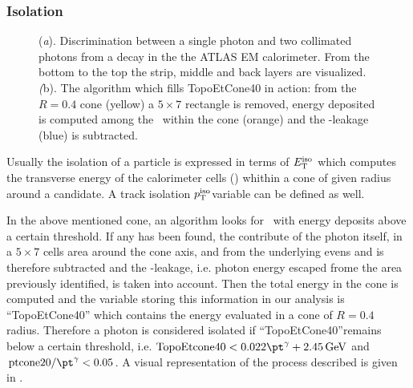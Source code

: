 \subsubsection{Isolation}
\begin{figure}[tp]
\centering
{} \quad
{} 
\caption{(\emph{a}). Discrimination between a single photon and two collimated photons from a \pizero decay in the the ATLAS EM calorimeter. From the bottom to the top the strip, middle and back layers are visualized. \\ \emph({b}). The algorithm which fills TopoEtCone40 in action: from the $R=0.4$ cone (yellow) a $5\times7$ rectangle is removed, energy deposited is computed among the \topo~within the cone (orange) and the \pt-leakage (blue) is subtracted.}
\end{figure}
Usually the isolation of a particle is expressed in terms of $E_\textup{T}^{\textup{iso}}$ which computes the transverse energy of the calorimeter cells (\topo) whithin a cone of given radius around a candidate. A track isolation $p_\textup{T}^{\textup{iso}}$variable can be defined as well.

In the above mentioned cone, an algorithm looks for \topo~with energy deposits above a certain threshold. If any has been found, the contribute of the photon itself, in a $5\times7$ cells area around the cone axis, and from the underlying evens and \pileup is therefore subtracted and the \pt-leakage, i.e. photon energy escaped frome the area previously identified, is taken into account. Then the total energy in the cone is computed and the variable storing this information in our analysis is ``TopoEtCone40'' which contains the energy evaluated in a cone of $R=0.4$ radius. Therefore a photon is considered isolated if ``TopoEtCone40''remains below a certain threshold, i.e. $\text{TopoEtcone40} < 0.022\pt^\gamma + \SI{2.45}{\GeV}$ and $\text{ptcone20}/\pt^\gamma<0.05$. A visual representation of the process described is given in \Fig{\ref{topoetcone40}}.

